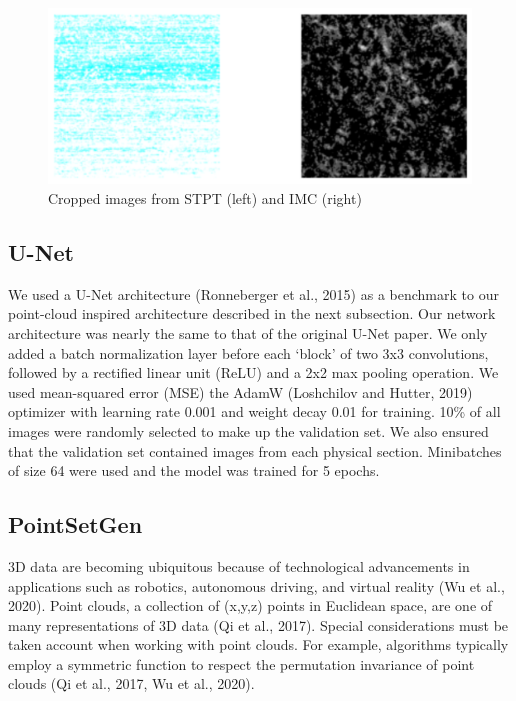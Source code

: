 \documentclass[10pt,twocolumn,letterpaper]{article}
\begin{document}
\begin{figure}[!h]
	\centering
	\captionsetup{justification=centering}
		\hspace*{-0.2cm}	
		\includegraphics[scale=0.35]{../figures/sample_imc_stpt_crop.png}
	\caption{Cropped images from STPT (left) and IMC (right)}		
\end{figure}


\subsection{U-Net}

We used a U-Net architecture (Ronneberger et al., 2015) as a benchmark to our point-cloud inspired architecture described in the next subsection. Our network architecture was nearly the same to that of the original U-Net paper. We only added a batch normalization layer before each ‘block’ of two 3x3 convolutions, followed by a rectified linear unit (ReLU) and a 2x2 max pooling operation. We used mean-squared error (MSE) the AdamW (Loshchilov and Hutter, 2019) optimizer with learning rate 0.001 and weight decay 0.01 for training. 10\% of all images were randomly selected to make up the validation set. We also ensured that the validation set contained images from each physical section. Minibatches of size 64 were used and the model was trained for 5 epochs.


\subsection{PointSetGen}

3D data are becoming ubiquitous because of technological advancements in applications such as robotics, autonomous driving, and virtual reality (Wu et al., 2020). Point clouds, a collection of (x,y,z) points in Euclidean space, are one of many representations of 3D data (Qi et al., 2017). Special considerations must be taken account when working with point clouds. For example, algorithms typically employ a symmetric function to respect the permutation invariance of point clouds (Qi et al., 2017, Wu et al., 2020). 
\end{document}
